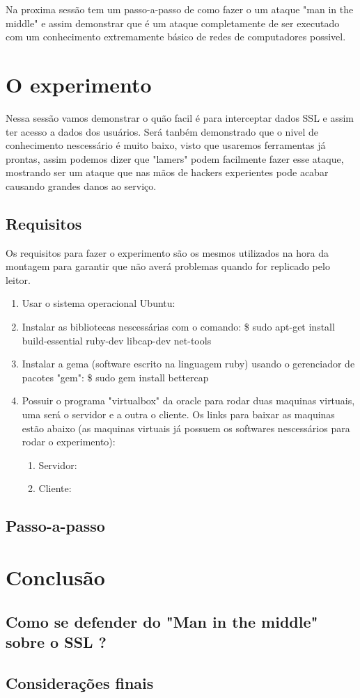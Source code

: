 \documentclass{article}
\begin{document}
    Na proxima sessão tem um passo-a-passo de como fazer o um ataque
  "man in the middle" e assim demonstrar que é um ataque completamente de
  ser executado com um conhecimento extremamente básico de redes de computadores
  possivel.

  \newpage

  \section{O experimento}
    Nessa sessão vamos demonstrar o quão facil é para interceptar dados SSL e
  assim ter acesso a dados dos usuários. Será tanbém demonstrado que o nivel de
  conhecimento nescessário é muito baixo, visto que usaremos ferramentas já prontas,
  assim podemos dizer que "lamers" podem facilmente fazer esse ataque, mostrando
  ser um ataque que nas mãos de hackers experientes pode acabar causando grandes
  danos ao serviço.

  \subsection{Requisitos}
    Os requisitos para fazer o experimento são os mesmos utilizados na hora
  da montagem para garantir que não averá problemas quando for replicado pelo
  leitor.

    \begin{enumerate}
      \item Usar o sistema operacional Ubuntu:
      \item Instalar as bibliotecas nescessárias com o comando:
        \$ sudo apt-get install build-essential ruby-dev libcap-dev net-tools
      \item Instalar a gema (software escrito na linguagem ruby) usando o
      gerenciador de pacotes "gem": \$ sudo gem install bettercap
      \item Possuir o programa "virtualbox" da oracle para rodar duas
      maquinas virtuais, uma será o servidor e a outra o cliente. Os links
      para baixar as maquinas estão abaixo (as maquinas virtuais
      já possuem os softwares nescessários para rodar o experimento):
      \begin{enumerate}
        \item Servidor:
        \item Cliente:
      \end{enumerate}
    \end{enumerate}

  \subsection{Passo-a-passo}

  \newpage

  \section{Conclusão}
  \subsection{Como se defender do "Man in the middle" sobre o SSL ?}
  \subsection{Considerações finais}
\end{document}
